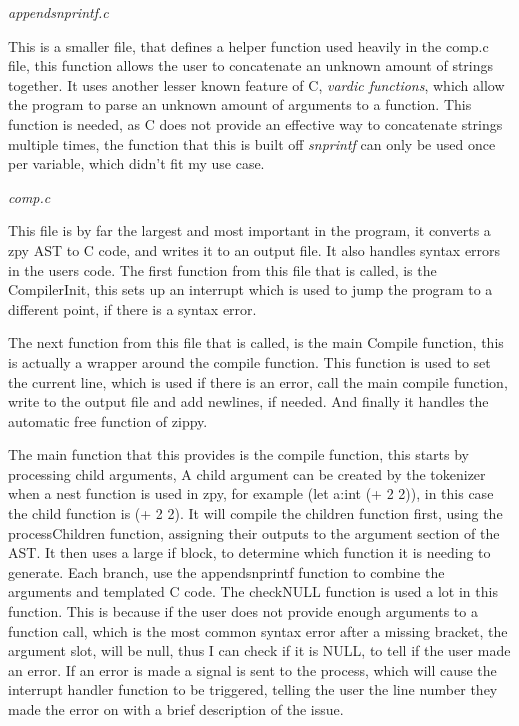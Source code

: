 \documentclass[a4paper,12pt]{article}
\begin{document}
{
\textit{appendsnprintf.c}

This is a smaller file, that defines a helper function used heavily in the comp.c file, this function allows the user
to concatenate an unknown amount of strings together. It uses another lesser known feature of C, \textit{vardic functions},
which allow the program to parse an unknown amount of arguments to a function. This function is needed, as C does not
provide an effective way to concatenate strings multiple times, the function that this is built off \textit{snprintf} can only be used 
once per variable, which didn't fit my use case.


\textit{comp.c}

This file is by far the largest and most important in the program, it converts a zpy AST to C code, and writes it to an output
file. It also handles syntax errors in the users code. The first function from this file that is called, is the CompilerInit,
this sets up an interrupt which is used to jump the program to a different point, if there is a syntax error.

The next function from this file that is called, is the main Compile function, this is actually a wrapper around the compile function.
This function is used to set the current line, which is used if there is an error, call the main compile function, write to 
the output file and add newlines, if needed. And finally it handles the automatic free function of zippy.

The main function that this provides is the compile function, this starts by processing child arguments, A child argument can be created
by the tokenizer when a nest function is used in zpy, for example (let a:int (+ 2 2)), in this case the child function is (+ 2 2). It
will compile the children function first, using the processChildren function, assigning their outputs to the argument section of the AST.
It then uses a large if block, to determine which function it is needing to generate. Each branch, use the appendsnprintf function to
combine the arguments and templated C code. The checkNULL function is used a lot in this function. This is because if the user does 
not provide enough arguments to a function call, which is the most common syntax error after a missing bracket, the argument slot, will
be null, thus I can check if it is NULL, to tell if the user made an error. If an error is made a signal is sent to the process, which 
will cause the interrupt handler function to be triggered, telling the user the line number they made the error on with a brief description
of the issue.

}
\end{document}
